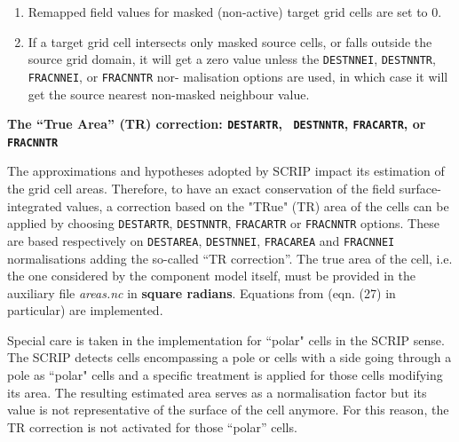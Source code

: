 \begin{enumerate}
  \item Remapped field values for masked (non-active) target grid cells are set to 0.
  
  \item If a target grid cell intersects only masked source cells, or falls outside the source grid domain,
it will get a zero value unless the {\tt DESTNNEI}, {\tt DESTNNTR}, {\tt FRACNNEI}, or {\tt FRACNNTR} nor-
malisation options are used, in which case it will get the source nearest non-masked neighbour
value.
    
    
  \end{enumerate}
  
  {\bf The ``True Area'' (TR) correction: {\tt \bf DESTARTR}, {\tt \bf
      DESTNNTR}, {\tt \bf FRACARTR}, or {\tt \bf FRACNNTR}}
  
The approximations and hypotheses adopted by SCRIP impact its estimation of the grid cell areas. Therefore, to have an exact conservation of the field surface-integrated values, a correction based on the "TRue" (TR) area of the cells can be applied by choosing {\tt DESTARTR}, {\tt DESTNNTR}, {\tt FRACARTR} or {\tt FRACNNTR} options. These are based respectively on {\tt DESTAREA}, {\tt DESTNNEI}, {\tt FRACAREA} and {\tt FRACNNEI} normalisations adding the so-called ``TR correction''. The true area of the cell, i.e. the one considered by the component model itself, must be provided in the auxiliary file {\it areas.nc} in {\bf square radians}. Equations from \cite{chavas 13} (eqn. (27) in particular) are implemented. 

Special care is taken in the implementation for ``polar" cells in the
SCRIP sense. The SCRIP detects cells encompassing a pole or cells with
a side going through a pole as ``polar" cells and a specific treatment
is applied for those cells modifying its area. The resulting estimated
area serves as a normalisation factor but its value is not
representative of the surface of the cell anymore. For this reason,
the TR correction is not activated for those ``polar'' cells.

